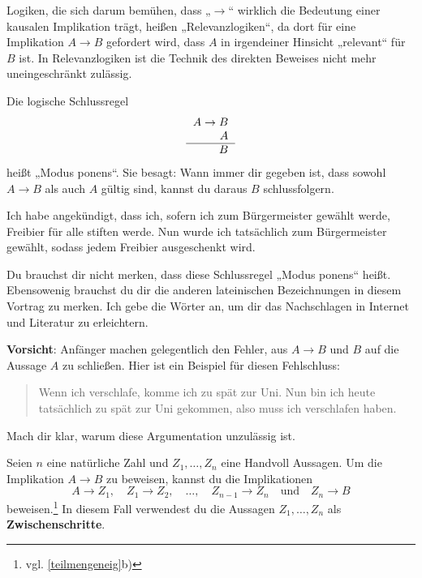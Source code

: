 \begin{vorschau}[* Relevanzlogiken]
    Logiken, die sich darum bemühen, dass „$\to$“ wirklich die Bedeutung einer kausalen Implikation trägt, heißen „Relevanzlogiken“, da dort für eine Implikation $A\to B$ gefordert wird, dass $A$ in irgendeiner Hinsicht „relevant“ für $B$ ist. In Relevanzlogiken ist die Technik des direkten Beweises nicht mehr uneingeschränkt zulässig.
\end{vorschau}


\begin{axiom} \label{modusponens} 
    Die logische Schlussregel
    \[\begin{tabular}{r}
        $A\to B$ \\
        $A$ \\
        \hline
        $B$
   \end{tabular}\]
    heißt „Modus ponens“. Sie besagt: Wann immer dir gegeben ist, dass sowohl $A\to B$ als auch $A$ gültig sind, kannst du daraus $B$ schlussfolgern.
\end{axiom}


\begin{bsp}
    Ich habe angekündigt, dass ich, sofern ich zum Bürgermeister gewählt werde, Freibier für alle stiften werde. Nun wurde ich tatsächlich zum Bürgermeister gewählt, sodass jedem Freibier ausgeschenkt wird.
\end{bsp}


\begin{bem}
    Du brauchst dir nicht merken, dass diese Schlussregel „Modus ponens“ heißt. Ebensowenig brauchst du dir die anderen lateinischen Bezeichnungen in diesem Vortrag zu merken. Ich gebe die Wörter an, um dir das Nachschlagen in Internet und Literatur zu erleichtern.
\end{bem}


\begin{bem}
    \textbf{Vorsicht}: Anfänger machen gelegentlich den Fehler, aus $A\to B$ und $B$ auf die Aussage $A$ zu schließen. Hier ist ein Beispiel für diesen Fehlschluss:
    \begin{quote}
        Wenn ich verschlafe, komme ich zu spät zur Uni. Nun bin ich heute tatsächlich zu spät zur Uni gekommen, also muss ich verschlafen haben.
    \end{quote}
    Mach dir klar, warum diese Argumentation unzulässig ist.
\end{bem}


\begin{satz} \label{implikationtrans}
    Seien $n$ eine natürliche Zahl und $Z_1,\dots , Z_n$ eine Handvoll Aussagen. Um die Implikation $A\to B$ zu beweisen, kannst du die Implikationen
        \[ A\to Z_1,\quad Z_1\to Z_2,\quad \dots ,\quad Z_{n-1}\to Z_n\quad \text{und}\quad Z_n\to B \]
    beweisen.\footnote{vgl. \cref{teilmengeneig}b)} In diesem Fall verwendest du die Aussagen $Z_1,\dots , Z_n$ als \textbf{Zwischenschritte}.
\end{satz}


